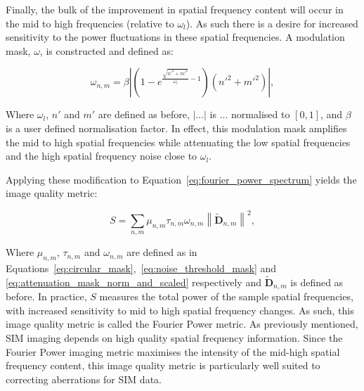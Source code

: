 Finally, the bulk of the improvement in spatial frequency content will
occur in the mid to high frequencies (relative to $\omega_{l}$). As such there is 
a desire for increased sensitivity to the power fluctuations in these 
spatial frequencies. A modulation mask, $\omega$, is constructed and 
defined as:

\begin{equation}\label{eq:attenuation_mask_norm_and_scaled}
\omega_{n,m} = \beta \left| \left(1 - e^{\frac{\sqrt{n'^{2} + m'^{2}}}{\omega_{l}}-1}\right) \left(n'^{2} + m'^{2}\right) \right|,
\end{equation}

Where $\omega_{l}$, $n'$ and $m'$ are defined as before, $\left|...\right|$ 
is $...$ normalised to $[0,1]$, and $\beta$ is a user defined 
normalisation factor. In effect, this modulation mask amplifies the mid 
to high spatial frequencies while attenuating the low spatial frequencies 
and the high spatial frequency noise close to $\omega_{l}$.

Applying these modification to Equation~\ref{eq:fourier_power_spectrum} 
yields the image quality metric:

\begin{equation}\label{eq:Fourier_power_metric}
S = \sum\limits_{n,m}{\mu_{n,m}\tau_{n,m}\omega_{n,m}\left\| \tilde{\textbf{D}}_{n,m} \right\|^2},
\end{equation}

Where $\mu_{n,m}$, $\tau_{n,m}$ and $\omega_{n,m}$ are defined as in
Equations~\ref{eq:circular_mask},~\ref{eq:noise_threshold_mask} and
\ref{eq:attenuation_mask_norm_and_scaled} respectively and 
$\tilde{\textbf{D}}_{n,m}$ is defined as before. In practice, $S$
measures the total power of the sample spatial frequencies, with 
increased sensitivity to mid to high spatial frequency changes. As
such, this image quality metric is called the Fourier Power metric.
As previously mentioned, SIM imaging depends on high quality spatial 
frequency information\cite{debarre2008adaptive,thomas2015enhanced}. 
Since the Fourier Power imaging metric maximises the intensity of 
the mid-high spatial frequency content, this image quality metric 
is particularly well suited to correcting aberrations for SIM data.
